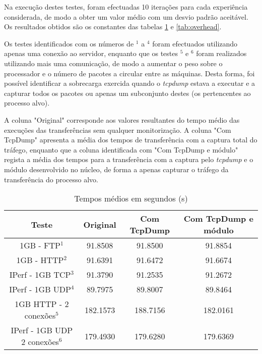 Na execução destes testes, foram efectuadas 10 iterações para cada experiência considerada, de modo a obter um valor médio com um desvio padrão aceitável.
 Os resultados obtidos são os constantes das tabelas \ref{tab:desempenho} e \ref{tab:overhead}.

Os testes identificados com os números de $^{1}$ a $^{4}$ foram efectuados utilizando apenas uma conexão ao servidor, enquanto que os testes $^{5}$ e $^{6}$ foram realizados utilizando mais uma comunicação, de modo a aumentar o peso sobre o processador e o número de pacotes a circular entre as máquinas. 
 Desta forma, foi possível identificar a sobrecarga exercida quando o \textit{tcpdump} estava a executar e a capturar todos os pacotes ou apenas um subconjunto destes (os pertencentes ao processo alvo).

 A coluna "Original" corresponde aos valores resultantes do tempo médio das execuções das transferências sem qualquer monitorização.
 A coluna "Com TcpDump" apresenta a média dos tempos de transferência com a captura total do tráfego, enquanto que a coluna identificada com "Com TcpDump e módulo" regista a média dos tempos para a transferência com a captura pelo \textit{tcpdump} e o módulo desenvolvido no núcleo, de forma a apenas capturar o tráfego da transferência do processo alvo.
\begin{table}
\begin{center}
\caption{Tempos médios em segundos (s)}
\begin{tabular}{ | c | c | c | c |  }
\hline
Teste & \hspace {0.3cm} Original \hspace {0.3cm}& \hspace {0.2cm} Com TcpDump \hspace {0.2cm} & Com TcpDump e módulo \\
\hline
1GB - FTP$^{1}$ & 91.8508	& 91.8500 & 91.8854 \\
1GB - HTTP$^{2}$ & 91.6391 & 91.6472 & 91.6674 \\ 
IPerf - 1GB TCP$^{3}$ & 91.3790	& 91.2535	& 91.2672 \\
IPerf - 1GB UDP$^{4}$ & 89.7975 & 89.8007 & 89.8464 \\
\hline
\hline
1GB HTTP - 2 conexões$^{5}$ & 182.1573 & 188.7156 & 182.0161 \\
IPerf - 1GB UDP 2 conexões$^{6}$ & 179.4930 & 179.6280 & 179.6369 \\
\hline
\end{tabular}
\label{tab:desempenho}
\end{center}
\end{table}

